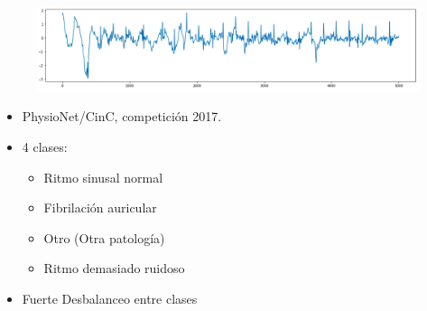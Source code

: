 \begin{frame}
\begin{overprint}
        \begin{figure}
            \centering
            \includegraphics[keepaspectratio=true,height=0.25\paperheight]{Images/noise.png}
        \end{figure}
        
        \begin{itemize}
            \item PhysioNet/CinC, competición 2017.
            \item 4 clases: 
                \begin{itemize}
                    \item Ritmo sinusal normal
                    \item Fibrilación auricular
                    \item Otro (Otra patología)
                    \item Ritmo demasiado ruidoso
                \end{itemize}
            \item Fuerte Desbalanceo entre clases
        \end{itemize}
        
        \begin{table}[htbp]
            \begin{center}
            \end{center}
            \caption{Datos del conjunto de entrenamiento}
            \label{table:BD}
        \end{table}
\end{overprint}
\end{frame}



